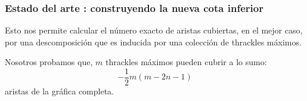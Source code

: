 \begin{frame}
\frametitle{Estado del arte : construyendo la nueva cota inferior}
Esto nos permite calcular el número exacto de aristas cubiertas, en el mejor caso, por una descomposición que es inducida por una colección de thrackles máximos. 

Nosotros probamos que, $m$ thrackles máximos pueden cubrir a lo sumo:
\[
-\frac{1}{2}m(m-2n-1)
\] aristas de la gráfica completa.
\pause 

\begin{table}
	\centering
{}
\end{table}
\end{frame}

